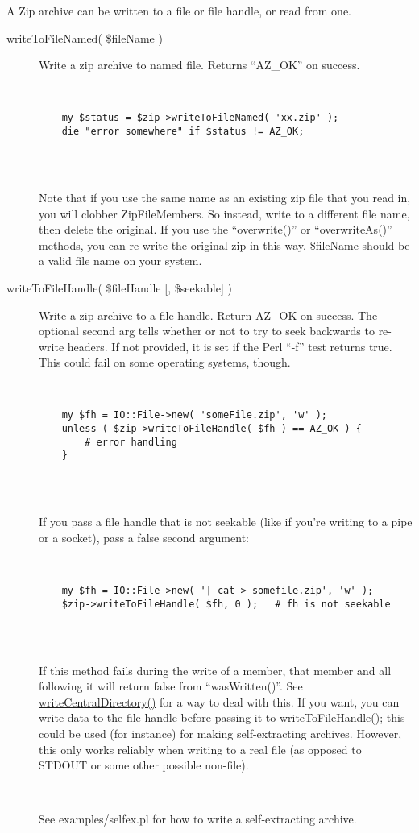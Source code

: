 \documentclass[]{article}
\renewcommand{\emph}[1]{\underline{#1}}
\begin{document}
A Zip archive can be written to a file or file handle, or read from one.

\begin{description}
\item[writeToFileNamed( \$fileName )]
Write a zip archive to named file. Returns ``AZ\_OK'' on success.

~

\begin{verbatim}
    my $status = $zip->writeToFileNamed( 'xx.zip' );
    die "error somewhere" if $status != AZ_OK;
    
\end{verbatim}

~

Note that if you use the same name as an existing zip file that you read
in, you will clobber ZipFileMembers. So instead, write to a different
file name, then delete the original. If you use the ``overwrite()'' or
``overwriteAs()'' methods, you can re-write the original zip in this
way. \$fileName should be a valid file name on your system.
\end{description}

\begin{description}
\item[writeToFileHandle( \$fileHandle {[}, \$seekable{]} )]
Write a zip archive to a file handle. Return AZ\_OK on success. The
optional second arg tells whether or not to try to seek backwards to
re-write headers. If not provided, it is set if the Perl ``-f'' test
returns true. This could fail on some operating systems, though.

~

\begin{verbatim}
    my $fh = IO::File->new( 'someFile.zip', 'w' );
    unless ( $zip->writeToFileHandle( $fh ) == AZ_OK ) {
        # error handling
    }
    
\end{verbatim}

~

If you pass a file handle that is not seekable (like if you're writing
to a pipe or a socket), pass a false second argument:

~

\begin{verbatim}
    my $fh = IO::File->new( '| cat > somefile.zip', 'w' );
    $zip->writeToFileHandle( $fh, 0 );   # fh is not seekable
    
\end{verbatim}

~

If this method fails during the write of a member, that member and all
following it will return false from ``wasWritten()''. See
\emph{writeCentralDirectory()} for a way to deal with this. If you want,
you can write data to the file handle before passing it to
\emph{writeToFileHandle()}; this could be used (for instance) for making
self-extracting archives. However, this only works reliably when writing
to a real file (as opposed to STDOUT or some other possible non-file).

~

See examples/selfex.pl for how to write a self-extracting archive.
\end{description}
\end{document}
